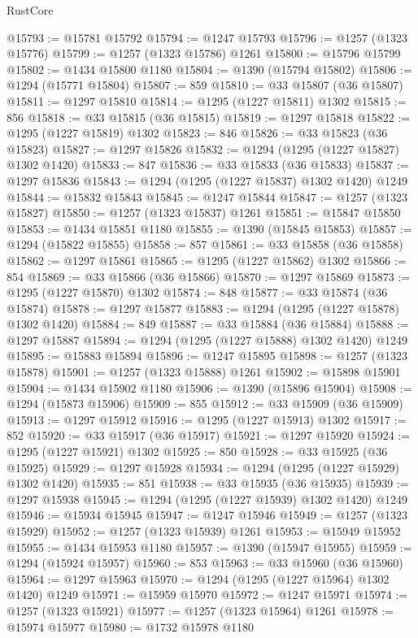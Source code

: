 \begin{lexlean}{RustCore}
\begin{coremodule}
@15793 := @15781 @15792
@15794 := @1247 @15793
@15796 := @1257 (@1323 @15776)
@15799 := @1257 (@1323 @15786) @1261
@15800 := @15796 @15799
@15802 := @1434 @15800 @1180
@15804 := @1390 (@15794 @15802)
@15806 := @1294 (@15771 @15804)
@15807 := 859
@15810 := @33 @15807 (@36 @15807)
@15811 := @1297 @15810
@15814 := @1295 (@1227 @15811) @1302
@15815 := 856
@15818 := @33 @15815 (@36 @15815)
@15819 := @1297 @15818
@15822 := @1295 (@1227 @15819) @1302
@15823 := 846
@15826 := @33 @15823 (@36 @15823)
@15827 := @1297 @15826
@15832 := @1294 (@1295 (@1227 @15827) @1302 @1420)
@15833 := 847
@15836 := @33 @15833 (@36 @15833)
@15837 := @1297 @15836
@15843 := @1294 (@1295 (@1227 @15837) @1302 @1420) @1249
@15844 := @15832 @15843
@15845 := @1247 @15844
@15847 := @1257 (@1323 @15827)
@15850 := @1257 (@1323 @15837) @1261
@15851 := @15847 @15850
@15853 := @1434 @15851 @1180
@15855 := @1390 (@15845 @15853)
@15857 := @1294 (@15822 @15855)
@15858 := 857
@15861 := @33 @15858 (@36 @15858)
@15862 := @1297 @15861
@15865 := @1295 (@1227 @15862) @1302
@15866 := 854
@15869 := @33 @15866 (@36 @15866)
@15870 := @1297 @15869
@15873 := @1295 (@1227 @15870) @1302
@15874 := 848
@15877 := @33 @15874 (@36 @15874)
@15878 := @1297 @15877
@15883 := @1294 (@1295 (@1227 @15878) @1302 @1420)
@15884 := 849
@15887 := @33 @15884 (@36 @15884)
@15888 := @1297 @15887
@15894 := @1294 (@1295 (@1227 @15888) @1302 @1420) @1249
@15895 := @15883 @15894
@15896 := @1247 @15895
@15898 := @1257 (@1323 @15878)
@15901 := @1257 (@1323 @15888) @1261
@15902 := @15898 @15901
@15904 := @1434 @15902 @1180
@15906 := @1390 (@15896 @15904)
@15908 := @1294 (@15873 @15906)
@15909 := 855
@15912 := @33 @15909 (@36 @15909)
@15913 := @1297 @15912
@15916 := @1295 (@1227 @15913) @1302
@15917 := 852
@15920 := @33 @15917 (@36 @15917)
@15921 := @1297 @15920
@15924 := @1295 (@1227 @15921) @1302
@15925 := 850
@15928 := @33 @15925 (@36 @15925)
@15929 := @1297 @15928
@15934 := @1294 (@1295 (@1227 @15929) @1302 @1420)
@15935 := 851
@15938 := @33 @15935 (@36 @15935)
@15939 := @1297 @15938
@15945 := @1294 (@1295 (@1227 @15939) @1302 @1420) @1249
@15946 := @15934 @15945
@15947 := @1247 @15946
@15949 := @1257 (@1323 @15929)
@15952 := @1257 (@1323 @15939) @1261
@15953 := @15949 @15952
@15955 := @1434 @15953 @1180
@15957 := @1390 (@15947 @15955)
@15959 := @1294 (@15924 @15957)
@15960 := 853
@15963 := @33 @15960 (@36 @15960)
@15964 := @1297 @15963
@15970 := @1294 (@1295 (@1227 @15964) @1302 @1420) @1249
@15971 := @15959 @15970
@15972 := @1247 @15971
@15974 := @1257 (@1323 @15921)
@15977 := @1257 (@1323 @15964) @1261
@15978 := @15974 @15977
@15980 := @1732 @15978 @1180

\end{coremodule}
\end{lexlean}
